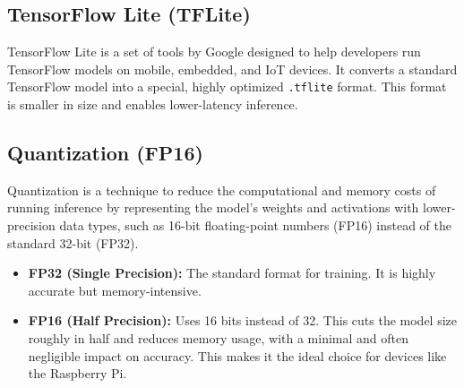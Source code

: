 \subsection{TensorFlow Lite (TFLite)}
TensorFlow Lite is a set of tools by Google designed to help developers run TensorFlow models on mobile, embedded, and IoT devices. It converts a standard TensorFlow model into a special, highly optimized \texttt{.tflite} format. This format is smaller in size and enables lower-latency inference.

\subsection{Quantization (FP16)}
Quantization is a technique to reduce the computational and memory costs of running inference by representing the model's weights and activations with lower-precision data types, such as 16-bit floating-point numbers (FP16) instead of the standard 32-bit (FP32).
\begin{itemize}
    \item \textbf{FP32 (Single Precision):} The standard format for training. It is highly accurate but memory-intensive.
    \item \textbf{FP16 (Half Precision):} Uses 16 bits instead of 32. This cuts the model size roughly in half and reduces memory usage, with a minimal and often negligible impact on accuracy. This makes it the ideal choice for devices like the Raspberry Pi.
\end{itemize}
